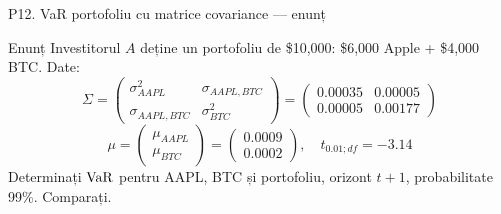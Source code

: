 \documentclass[9pt, aspectratio=169, t]{beamer}
\begin{document}
\begin{frame}{P12. VaR portofoliu cu matrice covariance --- enunț}
\begin{block}{Enunț}
Investitorul $A$ deține un portofoliu de \$10{,}000: \$6{,}000 Apple + \$4{,}000 BTC. Date:
\[
\Sigma = \begin{pmatrix}\sigma_{AAPL}^2 & \sigma_{AAPL,BTC} \\ \sigma_{AAPL,BTC} & \sigma_{BTC}^2\end{pmatrix}
= \begin{pmatrix}0.00035 & 0.00005 \\ 0.00005 & 0.00177\end{pmatrix}
\]
\[
\mu = \begin{pmatrix}\mu_{AAPL}\\\mu_{BTC}\end{pmatrix} = \begin{pmatrix}0.0009\\0.0002\end{pmatrix}, \quad t_{0.01;df}=-3.14
\]
Determinați $\text{VaR}$ pentru AAPL, BTC și portofoliu, orizont $t+1$, probabilitate 99\%. Comparați.
\end{block}
\end{frame}
\end{document}
